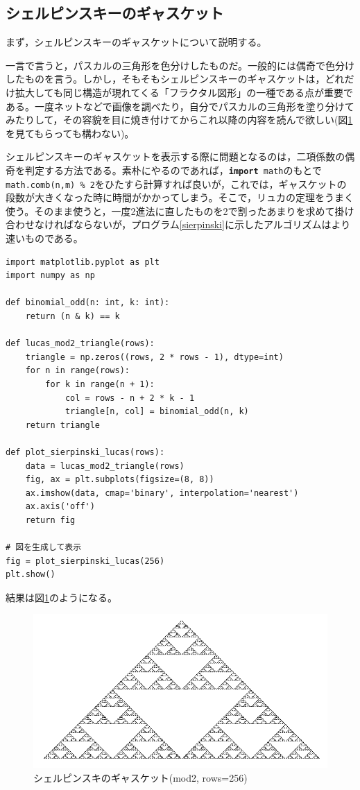 \subsection{シェルピンスキーのギャスケット}
まず，シェルピンスキーのギャスケットについて説明する。

一言で言うと，パスカルの三角形を色分けしたものだ。一般的には偶奇で色分けしたものを言う。しかし，そもそもシェルピンスキーのギャスケットは，どれだけ拡大しても同じ構造が現れてくる「フラクタル図形」の一種である点が重要である。一度ネットなどで画像を調べたり，自分でパスカルの三角形を塗り分けてみたりして，その容貌を目に焼き付けてからこれ以降の内容を読んで欲しい(図\ref{sierp_2_and}を見てもらっても構わない)。

\vspace{10pt}

シェルピンスキーのギャスケットを表示する際に問題となるのは，二項係数の偶奇を判定する方法である。素朴にやるのであれば，\texttt{\textbf{import} math}のもとで\texttt{math.comb(n,m) \% 2}をひたすら計算すれば良いが，これでは，ギャスケットの段数が大きくなった時に時間がかかってしまう。そこで，リュカの定理をうまく使う。そのまま使うと，一度2進法に直したものを2で割ったあまりを求めて掛け合わせなければならないが，プログラム\ref{sierpinski}に示したアルゴリズムはより速いものである。

\begin{lstlisting}[caption=uszczelka Sierpińskiego,label=sierpinski]
import matplotlib.pyplot as plt
import numpy as np

def binomial_odd(n: int, k: int):
    return (n & k) == k

def lucas_mod2_triangle(rows):
    triangle = np.zeros((rows, 2 * rows - 1), dtype=int)
    for n in range(rows):
        for k in range(n + 1):
            col = rows - n + 2 * k - 1
            triangle[n, col] = binomial_odd(n, k)
    return triangle

def plot_sierpinski_lucas(rows):
    data = lucas_mod2_triangle(rows)
    fig, ax = plt.subplots(figsize=(8, 8))
    ax.imshow(data, cmap='binary', interpolation='nearest')
    ax.axis('off')
    return fig

# 図を生成して表示
fig = plot_sierpinski_lucas(256)
plt.show()
\end{lstlisting}

結果は図\ref{sierp_2_and}のようになる。
\begin{figure}[ht]
    \centering
        \includegraphics[scale=0.5]{Figure_using_and.png}
    \caption{シェルピンスキのギャスケット(mod2, rows=256)}
    \label{sierp_2_and}
\end{figure}

